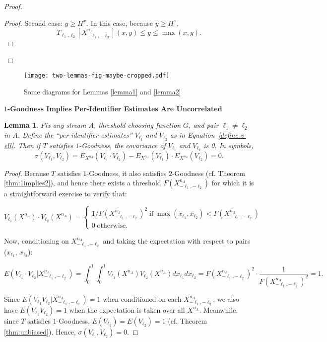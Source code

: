 \documentclass{article}
\newcommand{\xn}{X^{n_A}}
\newcommand{\xnmltwo}{X^{n_A}_{-\ell_1, -\ell_2}}
\newtheorem{lemma}[theorem]{Lemma}
\begin{document}
\begin{proof}
\begin{proof}
\noindent Second case: $y \ge H^x$. In this case,
because $y \ge H^x$,
\begin{equation}
T_{\ell_1, \ell_2}[\xnmltwo](x,y) \le y \le \max(x,y).
\end{equation}
\end{proof}
\end{proof}

\begin{figure*}
\begin{center}
\texttt{[image: two-lemmas-fig-maybe-cropped.pdf]}
\end{center}
\caption{Some diagrams for Lemmas \ref{lemma1} and \ref{lemma2}}
\end{figure*}

\noindent \textbf{$1$-Goodness Implies Per-Identifier Estimates Are Uncorrelated}
 \label{sec:zerocovariance}


\begin{lemma} \label{lemma:zerocovariances} Fix any stream $A$, threshold choosing function $G$, and pair $\ell_1 \neq \ell_2$ in $A$. Define the ``per-identifier estimates'' $V_{\ell_1}$ and $V_{\ell_2}$ as in Equation~\eqref{define-v-ell}. Then
if $T$ satisfies $1$-Goodness, the covariance of $V_{\ell_1}$ and $V_{\ell_2}$ is 0. In symbols,
$$\sigma(V_{\ell_1}, V_{\ell_2}) = E_{\xn}(V_{\ell_1} \cdot V_{\ell_2}) -E_{\xn}(V_{\ell_1}) \cdot E_{\xn}(V_{\ell_2})=0.$$
\end{lemma}
\begin{proof}
Because $T$ satisfies $1$-Goodness, it also satisfies $2$-Goodness (cf. Theorem \ref{thm:1implies2}), and hence there exists a threshold $F(\xnmltwo)$ for which it is a straightforward 
exercise to verify that:

\begin{equation}
V_{\ell_1}(\xn) \cdot V_{\ell_2}(\xn) 
= \left\{
\begin{array}{l}
1 / F(\xnmltwo)^2
\;\mathrm{if}\; \max (x_{\ell_1}, x_{\ell_2}) < F(\xnmltwo) \\
0 \;\mathrm{otherwise}.
\end{array}\right.
\end{equation}

\noindent Now, conditioning on $\xnmltwo$ and taking the expectation with respect to pairs ($x_{\ell_1}$, $x_{\ell_2}$):

\begin{equation}
E(V_{\ell_1} \cdot V_{\ell_2} | \xnmltwo) = \int_0^1 \int_0^1 
V_{\ell_1}(\xn) V_{\ell_2}(\xn) 
dx_{\ell_1} dx_{\ell_2}
= F(\xnmltwo)^2 \cdot \frac{1}{F(\xnmltwo)^2} = 1.
\end{equation}

\noindent Since 
$E(V_{\ell_1} V_{\ell_2} | \xnmltwo) = 1$
when conditioned on each 
$\xnmltwo$, 
we also have
$E(V_{\ell_1} V_{\ell_2}) = 1$
when the expectation is taken over all $\xn$.
Meanwhile, since $T$ satisfies $1$-Goodness, 
$E(V_{\ell_1}) = E(V_{\ell_2})=1$ (cf. Theorem \ref{thm:unbiased}).
Hence, $\sigma(V_{\ell_1}, V_{\ell_2}) = 0$.
\end{proof}
\end{document}
